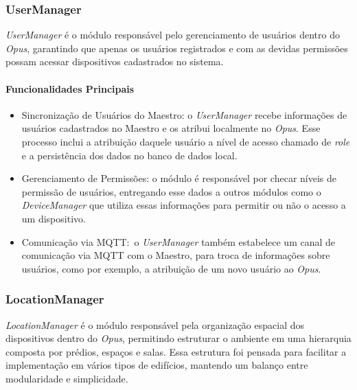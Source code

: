 \subsubsection{UserManager}
\emph{UserManager} é o módulo responsável pelo gerenciamento de usuários dentro do \emph{Opus}, garantindo que apenas os usuários registrados e com as devidas
permissões possam acessar dispositivos cadastrados no sistema.

\paragraph{Funcionalidades Principais}
\begin{itemize}
    \item Sincronização de Usuários do Maestro: o \emph{UserManager} recebe informações de usuários cadastrados no Maestro e os atribui 
        localmente no \emph{Opus}. Esse processo inclui a atribuição daquele usuário a nível de acesso chamado de \emph{role} e a persistência dos dados
        no banco de dados local.
    \item Gerenciamento de Permissões: o módulo é responsável por checar níveis de permissão de usuários, entregando esse dados a outros módulos 
        como o \emph{DeviceManager} que utiliza essas informações para permitir ou não o acesso a um dispositivo.
    \item Comunicação via MQTT:\ o \emph{UserManager} também estabelece um canal de comunicação via MQTT com o Maestro, para troca de informações
        sobre usuários, como por exemplo, a atribuição de um novo usuário ao \emph{Opus}.
\end{itemize}



\subsubsection{LocationManager}
\emph{LocationManager} é o módulo responsável pela organização espacial dos dispositivos dentro do \emph{Opus},
permitindo estruturar o ambiente em uma hierarquia composta por prédios, espaços e salas. Essa estrutura foi pensada
para facilitar a implementação em vários tipos de edifícios, mantendo um balanço entre modularidade e simplicidade.

